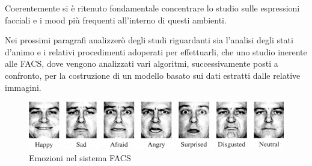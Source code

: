 Coerentemente si è ritenuto fondamentale concentrare lo studio sulle espressioni facciali e i mood più frequenti all’interno di questi ambienti.

Nei prossimi paragrafi analizzerò degli studi riguardanti sia l’analisi degli stati d’animo e i relativi procedimenti adoperati per effettuarli, che uno studio inerente alle FACS, dove vengono analizzati vari algoritmi, successivamente posti a confronto, per la costruzione di un modello basato sui dati estratti dalle relative immagini.

\begin{figure}
    \includegraphics[width=1\linewidth]{images/1.png}
    \caption{Emozioni nel sistema FACS}
\end{figure}